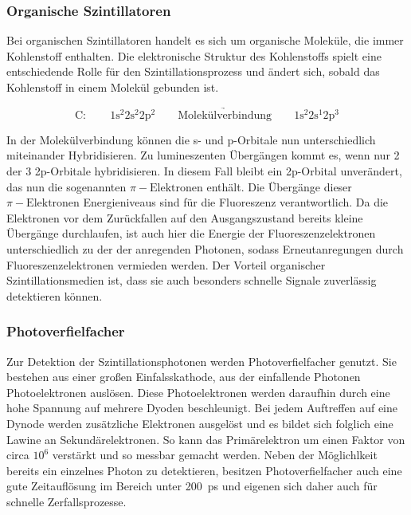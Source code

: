             \subsubsection*{Organische Szintillatoren}
                Bei organischen Szintillatoren handelt es sich um organische Moleküle, die immer Kohlenstoff enthalten. Die elektronische Struktur des Kohlenstoffs spielt eine entschiedende Rolle für den
                Szintillationsprozess und ändert sich, sobald das Kohlenstoff in einem Molekül gebunden ist.

                \begin{equation*}
                    \text{C}: \qquad 1\text{s}^2 2\text{s}^2 2\text{p}^2 \qquad \underrightarrow{\text{Molekülverbindung}} \qquad 1\text{s}^2 2\text{s}^1 2\text{p}^3
                \end{equation*}

                In der Molekülverbindung können die s- und p-Orbitale nun unterschiedlich miteinander Hybridisieren. Zu lumineszenten Übergängen kommt es, wenn nur 2 der 3 2p-Orbitale hybridisieren. In diesem
                Fall bleibt ein 2p-Orbital unverändert, das nun die sogenannten $\pi-\text{Elektronen}$ enthält. Die Übergänge dieser $\pi-\text{Elektronen}$ Energieniveaus sind für die Fluoreszenz verantwortlich.
                Da die Elektronen vor dem Zurückfallen auf den Ausgangszustand bereits kleine Übergänge durchlaufen, ist auch hier die Energie der Fluoreszenzelektronen unterschiedlich zu der der anregenden
                Photonen, sodass Erneutanregungen durch Fluoreszenzelektronen vermieden werden. Der Vorteil organischer Szintillationsmedien ist, dass sie auch besonders schnelle Signale zuverlässig 
                detektieren können.

            \subsubsection*{Photoverfielfacher}
                Zur Detektion der Szintillationsphotonen werden Photoverfielfacher genutzt. Sie bestehen aus einer großen Einfalsskathode, aus der einfallende Photonen Photoelektronen auslösen. Diese
                Photoelektronen werden daraufhin durch eine hohe Spannung auf mehrere Dyoden beschleunigt. Bei jedem Auftreffen auf eine Dynode werden zusätzliche Elektronen ausgelöst und es bildet sich 
                folglich eine Lawine an Sekundärelektronen. So kann das Primärelektron um einen Faktor von circa $10^6$ verstärkt und so messbar gemacht werden. Neben der Möglichlkeit bereits ein einzelnes 
                Photon zu detektieren, besitzen Photoverfielfacher auch eine gute Zeitauflösung im  Bereich unter \SI{200}{\pico\second} und eigenen sich daher auch für schnelle Zerfallsprozesse.

